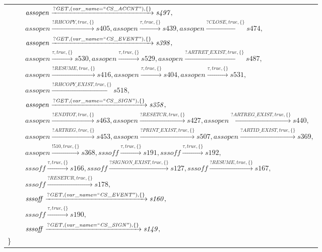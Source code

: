 \begin{tabular}{lcp{350px}}
& & $\mathit{assopen}\xrightarrow{\mathit{?GET}, \mathit{(var\_name = ``CS\_ACCNT")}, \{\}}\mathit{s497},$ \\
& & $\mathit{assopen}\xrightarrow{\mathit{?RHCOPY}, \mathit{true}, \{\}}\mathit{s405},\mathit{assopen}\xrightarrow{\mathit{\tau}, \mathit{true}, \{\}}\mathit{s439},\mathit{assopen}\xrightarrow{\mathit{?CLOSE}, \mathit{true}, \{\}}\mathit{s474},$ \\
& & $\mathit{assopen}\xrightarrow{\mathit{?GET}, \mathit{(var\_name = ``CS\_EVENT")}, \{\}}\mathit{s398},$ \\
& & $\mathit{assopen}\xrightarrow{\mathit{\tau}, \mathit{true}, \{\}}\mathit{s530},\mathit{assopen}\xrightarrow{\mathit{\tau}, \mathit{true}, \{\}}\mathit{s529},\mathit{assopen}\xrightarrow{\mathit{?ARTRET\_EXIST}, \mathit{true}, \{\}}\mathit{s487},$ \\
& & $\mathit{assopen}\xrightarrow{\mathit{?RESUME}, \mathit{true}, \{\}}\mathit{s416},\mathit{assopen}\xrightarrow{\mathit{\tau}, \mathit{true}, \{\}}\mathit{s404},\mathit{assopen}\xrightarrow{\mathit{\tau}, \mathit{true}, \{\}}\mathit{s531},$ \\
& & $\mathit{assopen}\xrightarrow{\mathit{?RHCOPY\_EXIST}, \mathit{true}, \{\}}\mathit{s518},$ \\
& & $\mathit{assopen}\xrightarrow{\mathit{?GET}, \mathit{(var\_name = ``CS\_SIGN")}, \{\}}\mathit{s358},$ \\
& & $\mathit{assopen}\xrightarrow{\mathit{?ENDTOT}, \mathit{true}, \{\}}\mathit{s463},\mathit{assopen}\xrightarrow{\mathit{?RESETCR}, \mathit{true}, \{\}}\mathit{s427},\mathit{assopen}\xrightarrow{\mathit{?ARTREG\_EXIST}, \mathit{true}, \{\}}\mathit{s440},$ \\
& & $\mathit{assopen}\xrightarrow{\mathit{?ARTREG}, \mathit{true}, \{\}}\mathit{s453},\mathit{assopen}\xrightarrow{\mathit{?PRINT\_EXIST}, \mathit{true}, \{\}}\mathit{s507},\mathit{assopen}\xrightarrow{\mathit{?ARTID\_EXIST}, \mathit{true}, \{\}}\mathit{s369},$ \\
& & $\mathit{assopen}\xrightarrow{\mathit{!510}, \mathit{true}, \{\}}\mathit{s368},\mathit{sssoff}\xrightarrow{\mathit{\tau}, \mathit{true}, \{\}}\mathit{s191},\mathit{sssoff}\xrightarrow{\mathit{\tau}, \mathit{true}, \{\}}\mathit{s192},$ \\
& & $\mathit{sssoff}\xrightarrow{\mathit{\tau}, \mathit{true}, \{\}}\mathit{s166},\mathit{sssoff}\xrightarrow{\mathit{?SIGNON\_EXIST}, \mathit{true}, \{\}}\mathit{s127},\mathit{sssoff}\xrightarrow{\mathit{?RESUME}, \mathit{true}, \{\}}\mathit{s167},$ \\
& & $\mathit{sssoff}\xrightarrow{\mathit{?RESETCR}, \mathit{true}, \{\}}\mathit{s178},$ \\
& & $\mathit{sssoff}\xrightarrow{\mathit{?GET}, \mathit{(var\_name = ``CS\_EVENT")}, \{\}}\mathit{s160},$ \\
& & $\mathit{sssoff}\xrightarrow{\mathit{\tau}, \mathit{true}, \{\}}\mathit{s190},$ \\
& & $\mathit{sssoff}\xrightarrow{\mathit{?GET}, \mathit{(var\_name = ``CS\_SIGN")}, \{\}}\mathit{s149},$ \\
\}
\end{tabular}

